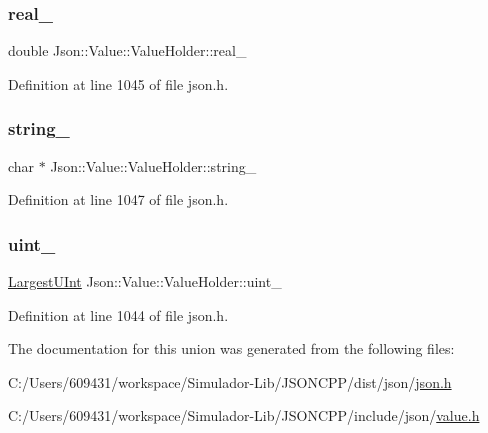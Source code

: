\subsubsection{\texorpdfstring{real\+\_\+}{real\_}}
{\footnotesize\ttfamily double Json\+::\+Value\+::\+Value\+Holder\+::real\+\_\+}



Definition at line 1045 of file json.\+h.

\hypertarget{union_json_1_1_value_1_1_value_holder_afedf5861e3368a0a9587e499f1ac23b9}{}\label{union_json_1_1_value_1_1_value_holder_afedf5861e3368a0a9587e499f1ac23b9} 
\subsubsection{\texorpdfstring{string\+\_\+}{string\_}}
{\footnotesize\ttfamily char $\ast$ Json\+::\+Value\+::\+Value\+Holder\+::string\+\_\+}



Definition at line 1047 of file json.\+h.

\hypertarget{union_json_1_1_value_1_1_value_holder_aab65665dc15a24a29a8e93cdeeaa7e50}{}\label{union_json_1_1_value_1_1_value_holder_aab65665dc15a24a29a8e93cdeeaa7e50} 
\subsubsection{\texorpdfstring{uint\+\_\+}{uint\_}}
{\footnotesize\ttfamily \hyperlink{class_json_1_1_value_a6682a3684d635e03fc06ba229fa24eec}{Largest\+U\+Int} Json\+::\+Value\+::\+Value\+Holder\+::uint\+\_\+}



Definition at line 1044 of file json.\+h.



The documentation for this union was generated from the following files\+:\begin{DoxyCompactItemize}
\item 
C\+:/\+Users/609431/workspace/\+Simulador-\/\+Lib/\+J\+S\+O\+N\+C\+P\+P/dist/json/\hyperlink{dist_2json_2json_8h}{json.\+h}\item 
C\+:/\+Users/609431/workspace/\+Simulador-\/\+Lib/\+J\+S\+O\+N\+C\+P\+P/include/json/\hyperlink{value_8h}{value.\+h}\end{DoxyCompactItemize}
